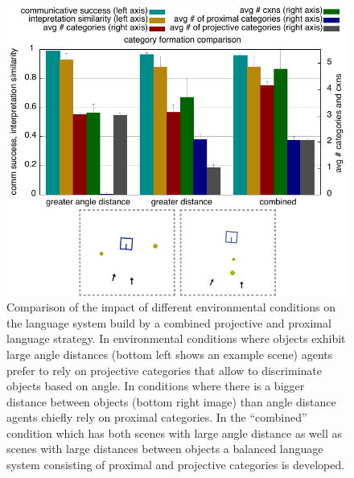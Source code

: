 \begin{figure}
\begin{center}
\includegraphics[width=1.0\columnwidth]{figs/category-formation-proximal+projective-compare-angle-distance-distance-combined.pdf}
\end{center}
\caption[Impact of different environmental conditions on 
proximal and projective systems]{Comparison of the impact of 
different environmental conditions on the language
system build by a combined projective and proximal language strategy. In environmental
conditions where objects exhibit large angle distances (bottom left shows an example scene) 
agents prefer to rely on projective categories that allow to discriminate objects based on angle. 
In conditions where there is a bigger distance between objects (bottom right image) 
than angle distance agents chiefly rely on
proximal categories. In the ``combined'' condition which has both scenes with 
large angle distance as well as scenes with large distances between objects a balanced
language system consisting of proximal and projective categories is developed.}
\label{f:compare-projective+proximal}
\end{figure}

